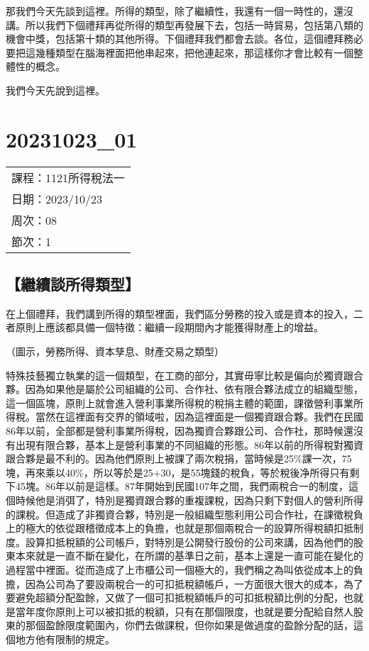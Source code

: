 \documentclass[]{ctexbook}
\begin{document}
那我們今天先談到這裡。所得的類型，除了繼續性，我還有一個一時性的，還沒講。所以我們下個禮拜再從所得的類型再發展下去，包括一時貿易，包括第八類的機會中獎，包括第十類的其他所得。下個禮拜我們都會去談。各位，這個禮拜務必要把這幾種類型在腦海裡面把他串起來，把他連起來，那這樣你才會比較有一個整體性的概念。

我們今天先說到這裡。

\hypertarget{section-13}{%
\chapter{20231023\_01}\label{section-13}}

\begin{longtable}[]{@{}l@{}}
\toprule()
\endhead
課程：1121所得稅法一 \\
日期：2023/10/23 \\
周次：08 \\
節次：1 \\
\bottomrule()
\end{longtable}

\hypertarget{ux7e7cux7e8cux8ac7ux6240ux5f97ux985eux578b}{%
\section{【繼續談所得類型】}\label{ux7e7cux7e8cux8ac7ux6240ux5f97ux985eux578b}}

在上個禮拜，我們講到所得的類型裡面，我們區分勞務的投入或是資本的投入，二者原則上應該都具備一個特徵：繼續一段期間內才能獲得財產上的增益。

（圖示，勞務所得、資本孳息、財產交易之類型）

特殊技藝獨立執業的這一個類型，在工商的部分，其實毋寧比較是偏向於獨資跟合夥。因為如果他是屬於公司組織的公司、合作社、依有限合夥法成立的組織型態，這一個區塊，原則上就會進入營利事業所得稅的稅捐主體的範圍，課徵營利事業所得稅。當然在這裡面有交界的領域啦，因為這裡面是一個獨資跟合夥。我們在民國86年以前，全部都是營利事業所得稅，因為獨資合夥跟公司、合作社，那時候還沒有出現有限合夥，基本上是營利事業的不同組織的形態。86年以前的所得稅對獨資跟合夥是最不利的。因為他們原則上被課了兩次稅捐，當時候是25\%課一次，75塊，再來乘以40\%，所以等於是25+30，是55塊錢的稅負，等於稅後净所得只有剩下45塊。86年以前是這樣。87年開始到民國107年之間，我們兩稅合一的制度，這個時候他是消弭了，特別是獨資跟合夥的重複課稅，因為只剩下對個人的營利所得的課稅。但造成了非獨資合夥，特別是一般組織型態利用公司合作社，在課徵稅負上的極大的依從跟稽徵成本上的負擔，也就是那個兩稅合一的設算所得稅額扣抵制度。設算扣抵稅額的公司帳戶，對特別是公開發行股份的公司來講，因為他們的股東本來就是一直不斷在變化，在所謂的基準日之前，基本上還是一直可能在變化的過程當中裡面。從而造成了上市櫃公司一個極大的，我們稱之為叫依從成本上的負擔，因為公司為了要設兩稅合一的可扣抵稅額帳戶，一方面很大很大的成本，為了要避免超額分配盈餘，又做了一個可扣抵稅額帳戶的可扣抵稅額比例的分配，也就是當年度你原則上可以被扣抵的稅額，只有在那個限度，也就是要分配給自然人股東的那個盈餘限度範圍內，你們去做課稅，但你如果是做過度的盈餘分配的話，這個地方他有限制的規定。
\end{document}
